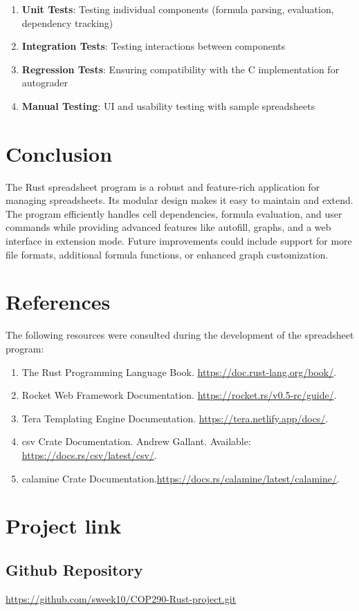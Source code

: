 \documentclass[12pt]{article}
\begin{document}
\begin{enumerate}
    \item \textbf{Unit Tests}: Testing individual components (formula parsing, evaluation, dependency tracking)
    \item \textbf{Integration Tests}: Testing interactions between components
    \item \textbf{Regression Tests}: Ensuring compatibility with the C implementation for autograder
    \item \textbf{Manual Testing}: UI and usability testing with sample spreadsheets
\end{enumerate}


\section{Conclusion}
The Rust spreadsheet program is a robust and feature-rich application for managing spreadsheets. Its modular design makes it easy to maintain and extend. The program efficiently handles cell dependencies, formula evaluation, and user commands while providing advanced features like autofill, graphs, and a web interface in extension mode. Future improvements could include support for more file formats, additional formula functions, or enhanced graph customization.

\section{References}
The following resources were consulted during the development of the spreadsheet program:
\begin{enumerate}
    \item The Rust Programming Language Book. \url{https://doc.rust-lang.org/book/}.
    \item Rocket Web Framework Documentation. \url{https://rocket.rs/v0.5-rc/guide/}. 
    \item Tera Templating Engine Documentation. \url{https://tera.netlify.app/docs/}. 
    \item csv Crate Documentation. Andrew Gallant. Available: \url{https://docs.rs/csv/latest/csv/}. 
    \item calamine Crate Documentation.\url{https://docs.rs/calamine/latest/calamine/}. 
\end{enumerate}

\section{Project link}
\subsection{Github Repository}
\href{https://github.com/sweek10/COP290-Rust-project.git}{https://github.com/sweek10/COP290-Rust-project.git}
\end{document}
